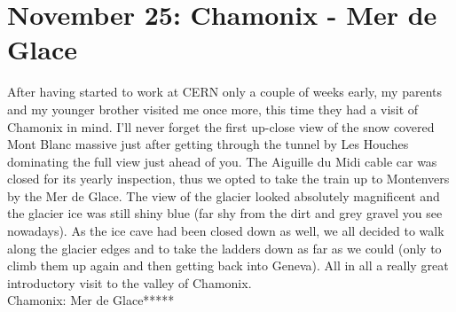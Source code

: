 \section{November 25: Chamonix - Mer de Glace}
\label{2006:Chamonix}

After having started to work at CERN only a couple of weeks early, my parents and my younger brother visited me once more, this time they had a visit of Chamonix in mind. I'll never forget the first up-close view of the snow covered Mont Blanc massive just after getting through the tunnel by Les Houches dominating the full view just ahead of you. The Aiguille du Midi cable car was closed for its yearly inspection, thus we opted to take the train up to Montenvers by the Mer de Glace. The view of the glacier looked absolutely magnificent and the glacier ice was still shiny blue (far shy from the dirt and grey gravel you see nowadays). As the ice cave had been closed down as well, we all decided to walk along the glacier edges and to take the ladders down as far as we could (only to climb them up again and then getting back into Geneva). All in all a really great introductory visit to the valley of Chamonix.\\

Chamonix: Mer de Glace*****\\